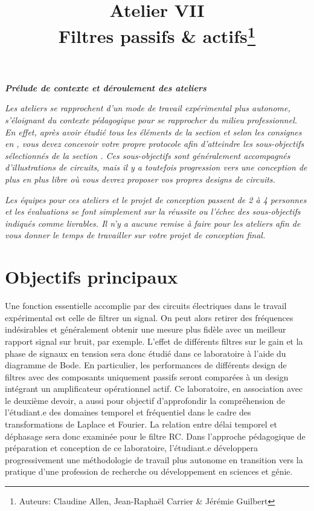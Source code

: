 \documentclass[canadien,12pt,oneside,letterpaper]{article}
\title{\textbf{Atelier VII}\\Filtres passifs \& actifs\thanks{Auteurs: Claudine Allen, Jean-Raphaël Carrier \& Jérémie Guilbert}}
\date{}
\begin{document}
\maketitle \vspace{-2cm}

\noindent\textit{\textbf{Prélude de contexte et déroulement des ateliers}}

\textit{Les ateliers se rapprochent d'un mode de travail expérimental plus autonome, s'éloignant du contexte pédagogique pour se rapprocher du milieu professionnel. En effet, après avoir étudié tous les éléments de la section  et selon les consignes en , vous devez concevoir votre propre protocole afin d'atteindre les sous-objectifs sélectionnés de la section . Ces sous-objectifs sont généralement accompagnés d'illustrations de circuits, mais il y a toutefois progression vers une conception de plus en plus libre où vous devrez proposer vos propres designs de circuits.}

\textit{Les équipes pour ces ateliers et le projet de conception passent de 2 à 4 personnes et les évaluations se font simplement sur la réussite ou l'échec des sous-objectifs indiqués comme livrables. Il n'y a aucune remise à faire pour les ateliers afin de vous donner le temps de travailler sur votre projet de conception final.}

\section{Objectifs principaux}

Une fonction essentielle accomplie par des circuits électriques dans le travail expérimental est celle de filtrer un signal. On peut alors retirer des fréquences indésirables et généralement obtenir une mesure plus fidèle avec un meilleur rapport signal sur bruit, par exemple. L’effet de différents filtres sur le gain et la phase de signaux en tension sera donc étudié dans ce laboratoire à l’aide du diagramme de Bode. En particulier, les performances de différents design de filtres avec des composants uniquement passifs seront comparées à un design intégrant un amplificateur opérationnel actif. Ce laboratoire, en association avec le deuxième devoir, a aussi pour objectif d’approfondir la compréhension de l’étudiant.e des domaines temporel et fréquentiel dans le cadre des transformations de Laplace et Fourier. La relation entre délai temporel et déphasage sera donc examinée pour le filtre RC. 
Dans l'approche pédagogique de préparation et conception de ce laboratoire, l'étudiant.e développera progressivement une méthodologie de travail plus autonome en transition vers la pratique d'une profession de recherche ou développement en sciences et génie. 
\end{document}
